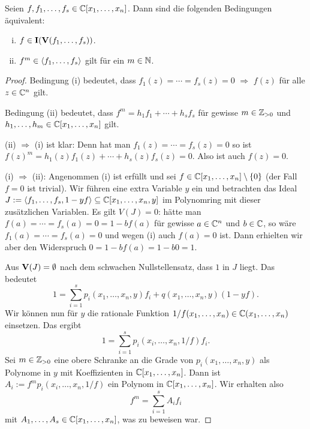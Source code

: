 \documentclass[11pt]{article}
\numberwithin{equation}{section}
\begin{document}
\begin{theorem} \label{thm:nullstellen:1}
	Seien $f, f_1,\ldots,f_s \in \mathbb{C}[x_1,\ldots,x_n]$. Dann sind die folgenden Bedingungen äquivalent: 
	\begin{enumerate}[(i)]
		\item $f \in \mathbf{I}(\mathbf{V}(f_1,\ldots,f_s))$. 
		\item $f^m \in \left< f_1,\ldots,f_s \right>$ gilt für ein $m \in \mathbb{N}$. 
	\end{enumerate} 
\end{theorem} 
\begin{proof}
 	Bedingung (i) bedeutet, dass $f_1(z) = \cdots = f_s(z) = 0$ $\Rightarrow$ $f(z)$ für alle $z \in \mathbb{C}^n$ gilt. 
 	
 	Bedingung (ii) bedeutet, dass $f^m = h_1 f_1 + \cdots + h_s f_s$ für gewisse $m \in \mathbb{Z}_{>0}$ und $h_1,\ldots,h_m \in \mathbb{C}[x_1,\ldots,x_n]$ gilt. 
 	
	(ii) $\Rightarrow$ (i) ist klar: Denn hat man $f_1(z) = \cdots = f_s(z)=0$ so ist $f(z)^m = h_1(z) f_1(z) + \cdots + h_s(z) f_s(z)=0$. Also ist auch $f(z) =0$. 
	
	(i) $\Rightarrow$ (ii): Angenommen (i) ist erfüllt und sei $f \in \mathbb{C}[x_1,\ldots,x_n] \setminus \{0\}$ (der Fall $f=0$ ist trivial). Wir führen eine extra Variable $y$ ein und betrachten das Ideal $J:=\left< f_1,\ldots,f_s, 1 - y f  \right> \subseteq \mathbb{C}[x_1,\ldots,x_n,y]$ im Polynomring mit dieser zusätzlichen Variablen. Es gilt $V(J) = 0$:  hätte man $f(a) = \cdots = f_s(a) = 0 = 1 - b f(a)$ für gewisse $a \in \mathbb{C}^n$ und $b \in \mathbb{C}$, so wäre $f_1(a) = \cdots =f_s(a) =0$ und wegen (i) auch $f(a) =0$ ist. Dann erhielten wir aber den Widerspruch $0 = 1 - b f(a) = 1 - b 0 = 1$. 
	
	Aus $\mathbf{V}(J) = \emptyset$ nach dem schwachen Nullstellensatz, dass  $1$ in $J$ liegt. Das bedeutet
	\[
		1 = \sum_{i=1}^s p_i(x_1,\ldots,x_n,y) f_i + q(x_1,\ldots,x_n,y) (1 - y f). 
	\]
	Wir können nun für $y$ die rationale Funktion $1/f(x_1,\ldots,x_n) \in \mathbb{C}(x_1,\ldots,x_n)$ einsetzen.  Das ergibt 
	\[
		1 = \sum_{i=1}^s p_i(x_i,\ldots,x_n, 1/f) f_i. 
	\]
	Sei $m \in \mathbb{Z}_{>0}$ eine obere Schranke an die Grade von $p_i(x_1,\ldots,x_n,y)$ als Polynome in $y$ mit Koeffizienten in $\mathbb{C}[x_1,\ldots,x_n]$.  Dann ist $A_i := f^m p_i(x_i,\ldots,x_n, 1/f) $ ein Polynom in $\mathbb{C}[x_1,\ldots,x_n]$. Wir erhalten also 
	\[
		f^m = \sum_{i=1}^s A_i f_i
	\]
	mit $A_1,\ldots,A_s \in \mathbb{C}[x_1,\ldots,x_n]$, was zu beweisen war. 
\end{proof} 
\end{document}
